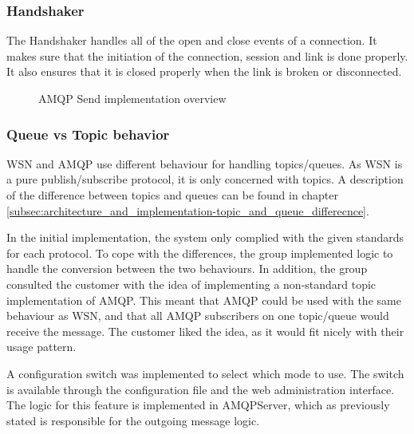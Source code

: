 \subsubsection{Handshaker}
The Handshaker handles all of the open and close events of a connection. It makes sure that the initiation of the connection, session and link is done properly. It also ensures that it is closed properly when the link is broken or disconnected.

\begin{center}
  \begin{figure}[ht!]
    \caption{AMQP Send implementation overview}
    \label{fig:amqp_send}
  \end{figure}
\end{center}

\subsubsection{Queue vs Topic behavior}
WSN and AMQP use different behaviour for handling topics/queues. As WSN is a pure publish/subscribe protocol, it is only concerned with topics. A description of the difference between topics and queues can be found in chapter \ref{subsec:architecture_and_implementation-topic_and_queue_differecnce}.

In the initial implementation, the system only complied with the given standards for each protocol. To cope with the differences, the group implemented logic to handle the conversion between the two behaviours. In addition, the group consulted the customer with the idea of implementing a non-standard topic implementation of AMQP. This meant that AMQP could be used with the same behaviour as WSN, and that all AMQP subscribers on one topic/queue would receive the message. The customer liked the idea, as it would fit nicely with their usage pattern. 

A configuration switch was implemented to select which mode to use. The switch is available through the configuration file and the web administration interface. The logic for this feature is implemented in AMQPServer, which as previously stated is responsible for the outgoing message logic.



\clearpage
